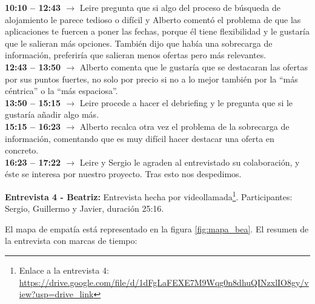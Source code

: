 \textbf{10:10 -- 12:43 $\rightarrow$} Leire pregunta que si algo del proceso de búsqueda de alojamiento le parece tedioso o difícil y Alberto comentó el problema de que 
las aplicaciones te fuercen a poner las fechas, porque él tiene flexibilidad y le gustaría que le salieran más opciones. También dijo que había una 
sobrecarga de información, preferiría que salieran menos ofertas pero más relevantes. \\
\textbf{12:43 -- 13:50 $\rightarrow$} Alberto comenta que le gustaría que se destacaran las ofertas por sus puntos fuertes, no solo por precio si no a 
lo mejor también por la “más céntrica” o la “más espaciosa”. \\
\textbf{13:50 -- 15:15 $\rightarrow$} Leire procede a hacer el debriefing y le pregunta que si le gustaría añadir algo más. \\
\textbf{15:15 -- 16:23 $\rightarrow$} Alberto recalca otra vez el problema de la sobrecarga de información, comentando que es muy difícil hacer destacar una oferta en concreto. \\
\textbf{16:23 -- 17:22 $\rightarrow$} Leire y Sergio le agraden al entrevistado su colaboración, y éste se interesa por nuestro proyecto. Tras esto nos despedimos.

\textbf{Entrevista 4 - Beatriz:} Entrevista hecha por videollamada\footnote{Enlace a la entrevista 4: \url{https://drive.google.com/file/d/1dFgLaFEXE7M9Wqg0n8dhuQINzxlIO8gy/view?usp=drive_link}}. Participantes: Sergio, Guillermo y Javier, duración 25:16.

El mapa de empatía está representado en la figura \ref{fig:mapa_bea}. El resumen de la entrevista con marcas de tiempo:

